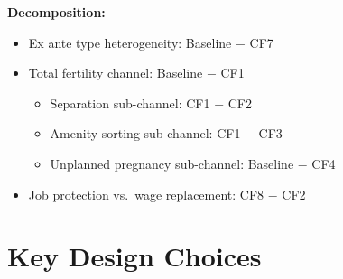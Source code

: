 \documentclass[11pt]{article}
\begin{document}
\noindent\textbf{Decomposition:}
\begin{itemize}[nosep]
  \item Ex ante type heterogeneity: Baseline $-$ CF7
  \item Total fertility channel: Baseline $-$ CF1
    \begin{itemize}[nosep]
      \item Separation sub-channel: CF1 $-$ CF2
      \item Amenity-sorting sub-channel: CF1 $-$ CF3
      \item Unplanned pregnancy sub-channel: Baseline $-$ CF4
    \end{itemize}
  \item Job protection vs.\ wage replacement: CF8 $-$ CF2
\end{itemize}

\section{Key Design Choices}
\end{document}
